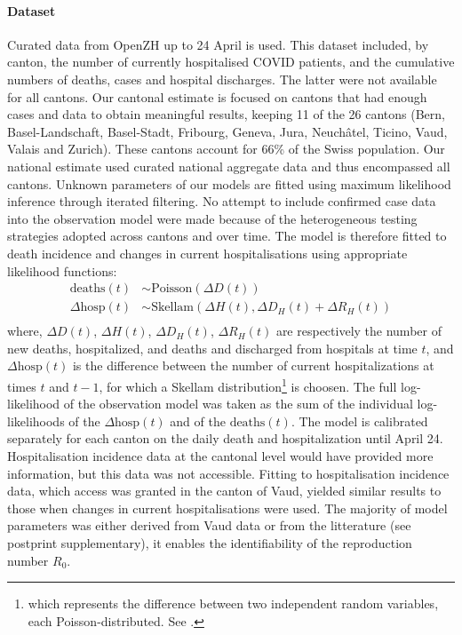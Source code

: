 \paragraph{Dataset} Curated data from OpenZH\cite[3\baselineskip]{openZH:OpenZHCovid19:2020} up to 24 April is used. This dataset included, by canton, the number of currently hospitalised COVID patients, and the cumulative numbers of deaths, cases and hospital discharges. The latter were not available for all cantons. Our cantonal estimate is focused on cantons that had enough cases and data to obtain meaningful results, keeping 11 of the 26 cantons (Bern, Basel-Landschaft, Basel-Stadt, Fribourg, Geneva, Jura, Neuchâtel, Ticino, Vaud, Valais and Zurich). These cantons account for 66\% of the Swiss population. Our national estimate used curated national aggregate data and thus encompassed all cantons\cite{Probst:DaenuprobstCovid19casesswitzerland:2020}. Unknown parameters of our models are fitted using maximum likelihood inference through iterated filtering\cite{Ionides:InferenceDynamicLatent:2015}. No attempt to include confirmed case data into the observation model were made because of the heterogeneous testing strategies adopted across cantons and over time. The model is therefore fitted to death incidence and changes in current hospitalisations using appropriate likelihood functions:
\begin{equation}
\begin{split}
 \text{deaths}(t) &\sim \text{Poisson}(\Delta D(t)) \\
\Delta  \text{hosp}(t) &\sim \text{Skellam}(\Delta H(t), \Delta D_H(t) + \Delta R_H(t)) \\
\end{split}
\end{equation}
\noindent where, $\Delta D(t)$, $\Delta H(t)$, $\Delta D_H(t)$, $\Delta R_H(t)$ are respectively the number of new deaths, hospitalized, and deaths and discharged from hospitals at time $t$, and $\Delta \text{hosp}(t)$ is the difference between the number of current hospitalizations at times $t$ and $t-1$, for which a Skellam distribution\footnote{which represents the difference between two independent random variables, each Poisson-distributed. See .} is choosen. The full log-likelihood of the observation model was taken as the sum of the individual log-likelihoods of the $\Delta \text{hosp}(t)$ and of the $\text{deaths}(t)$. 
The model is calibrated separately for each canton on the daily death and hospitalization until April 24. Hospitalisation incidence data at the cantonal level would have provided more information, but this data was not accessible. Fitting to hospitalisation incidence data, which access was granted in the canton of Vaud, yielded similar results to those when changes in current hospitalisations were used. The majority of model parameters was either derived from Vaud data or from the litterature (see postprint supplementary), it enables the identifiability of the reproduction number $R_0$.
 
